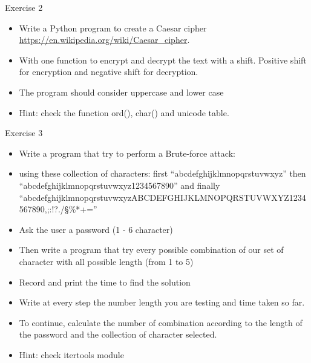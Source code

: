 \documentclass[
  8pt,
  ignorenonframetext,
]{beamer}
\providecommand{\tightlist}{%
  \setlength{\itemsep}{0pt}\setlength{\parskip}{0pt}}
\begin{document}
\begin{frame}{Exercise 2}
\protect\hypertarget{exercise-2}{}
\begin{itemize}
\tightlist
\item
  Write a Python program to create a Caesar cipher
  \url{https://en.wikipedia.org/wiki/Caesar_cipher}.
\item
  With one function to encrypt and decrypt the text with a shift.
  Positive shift for encryption and negative shift for decryption.
\item
  The program should consider uppercase and lower case
\item
  Hint: check the function ord(), char() and unicode table.
\end{itemize}
\end{frame}

\begin{frame}{Exercise 3}
\protect\hypertarget{exercise-3}{}
\begin{itemize}
\tightlist
\item
  Write a program that try to perform a Brute-force attack:
\item
  using these collection of characters: first
  ``abcdefghijklmnopqrstuvwxyz'' then
  ``abcdefghijklmnopqrstuvwxyz1234567890'' and finally
  ``abcdefghijklmnopqrstuvwxyzABCDEFGHIJKLMNOPQRSTUVWXYZ1234567890,;:!?./§\%*+=''
\item
  Ask the user a password (1 - 6 character)
\item
  Then write a program that try every possible combination of our set of
  character with all possible length (from 1 to 5)
\item
  Record and print the time to find the solution
\item
  Write at every step the number length you are testing and time taken
  so far.
\item
  To continue, calculate the number of combination according to the
  length of the password and the collection of character selected.
\item
  Hint: check itertools module
\end{itemize}
\end{frame}
\end{document}
